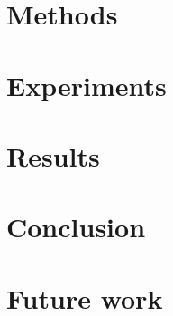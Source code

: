\documentclass[conference]{IEEEtran}
\begin{document}
\section{Methods}\label{sec:methods}


\section{Experiments}\label{sec:experiments}


\section{Results}\label{sec:results}


\section{Conclusion}\label{sec:conclusion}


\section{Future work}


\printbibliography[title={References}]
\end{document}

